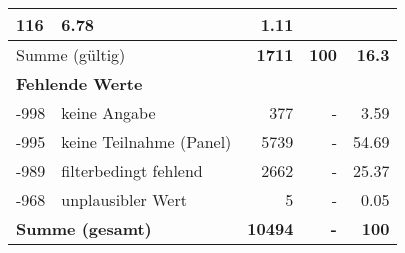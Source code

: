 \begin{longtable}{lXrrr}
       \num{116} &
       \num[round-mode=places,round-precision=2]{6.78} &
         \num[round-mode=places,round-precision=2]{1.11} \\
     \midrule
     \multicolumn{2}{l}{Summe (gültig)} &
       \textbf{\num{1711}} &
     \textbf{\num{100}} &
       \textbf{\num[round-mode=places,round-precision=2]{16.3}} \\
     \multicolumn{5}{l}{\textbf{Fehlende Werte}}\\
       -998 &
       keine Angabe &
         \num{377} &
        - &
         \num[round-mode=places,round-precision=2]{3.59} \\
       -995 &
       keine Teilnahme (Panel) &
         \num{5739} &
        - &
         \num[round-mode=places,round-precision=2]{54.69} \\
       -989 &
       filterbedingt fehlend &
         \num{2662} &
        - &
         \num[round-mode=places,round-precision=2]{25.37} \\
       -968 &
       unplausibler Wert &
         \num{5} &
        - &
         \num[round-mode=places,round-precision=2]{0.05} \\
     \midrule
     \multicolumn{2}{l}{\textbf{Summe (gesamt)}} &
          \textbf{\num{10494}} &
        \textbf{-} &
        \textbf{\num{100}} \\
     \bottomrule
     \end{longtable}
     
